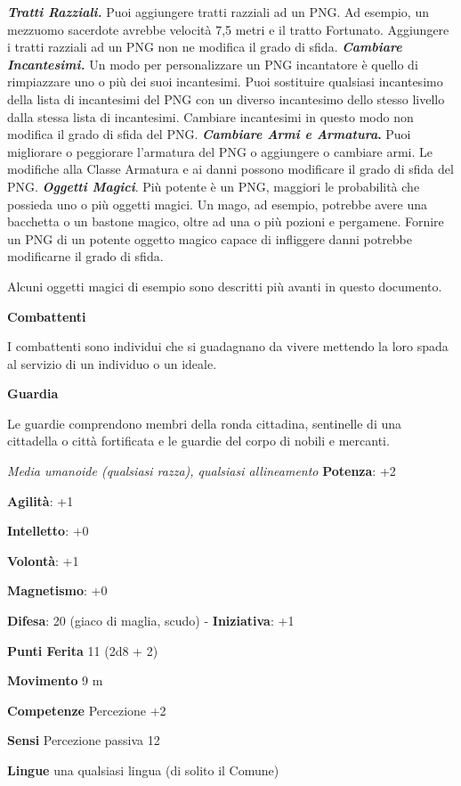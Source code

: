 \begin{multicols}{2}
\emph{\textbf{Tratti Razziali.}} Puoi aggiungere tratti razziali ad un
PNG. Ad esempio, un mezzuomo sacerdote avrebbe velocità 7,5 metri e il
tratto Fortunato. Aggiungere i tratti razziali ad un PNG non ne modifica
il grado di sfida. \emph{\textbf{Cambiare Incantesimi.}} Un modo per
personalizzare un PNG incantatore è quello di rimpiazzare uno o più dei
suoi incantesimi. Puoi sostituire qualsiasi incantesimo della lista di
incantesimi del PNG con un diverso incantesimo dello stesso livello
dalla stessa lista di incantesimi. Cambiare incantesimi in questo modo
non modifica il grado di sfida del PNG. \textbf{\emph{Cambiare Armi e
Armatura}.} Puoi migliorare o peggiorare l'armatura del PNG o aggiungere
o cambiare armi. Le modifiche alla Classe Armatura e ai danni possono
modificare il grado di sfida del PNG. \emph{\textbf{Oggetti Magici}}.
Più potente è un PNG, maggiori le probabilità che possieda uno o più
oggetti magici. Un mago, ad esempio, potrebbe avere una bacchetta o un
bastone magico, oltre ad una o più pozioni e pergamene. Fornire un PNG
di un potente oggetto magico capace di infliggere danni potrebbe
modificarne il grado di sfida.

Alcuni oggetti magici di esempio sono descritti più avanti in questo
documento.

\textbf{Combattenti}

I combattenti sono individui che si guadagnano da vivere mettendo la
loro spada al servizio di un individuo o un ideale.

\textbf{Guardia}

Le guardie comprendono membri della ronda cittadina, sentinelle di una
cittadella o città fortificata e le guardie del corpo di nobili e
mercanti.

\emph{Media umanoide (qualsiasi razza), qualsiasi allineamento}
\textbf{Potenza}: +2

\textbf{Agilità}: +1

\textbf{Intelletto}: +0

\textbf{Volontà}: +1

\textbf{Magnetismo}: +0

\textbf{Difesa}: 20 (giaco di maglia, scudo) - \textbf{Iniziativa}: +1

\textbf{Punti Ferita} 11 (2d8 + 2)

\textbf{Movimento} 9 m

\textbf{Competenze} Percezione +2

\textbf{Sensi} Percezione passiva 12

\textbf{Lingue} una qualsiasi lingua (di solito il Comune)


\end{multicols}
